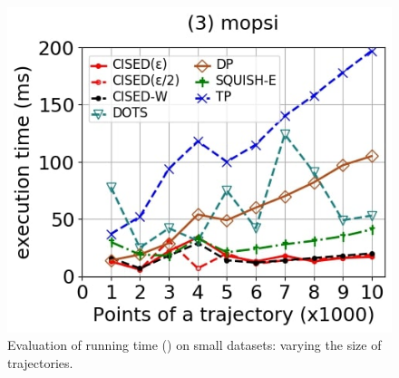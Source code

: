 {\begin{figure}[tb!]
	\includegraphics[scale=0.250]{Figures/Exp-SED-time-size-mopsi.jpg}	
	\vspace{-2ex}
	\caption{\small Evaluation of running time (\sed) on small datasets: varying the size of trajectories.}\label{fig:time-size-sed}
	\vspace{-2ex}
\end{figure}

}
